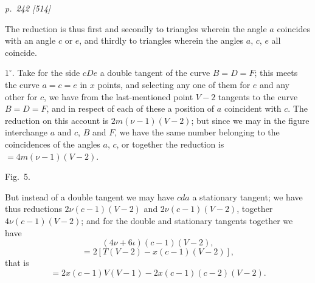 \documentclass[11pt,a4paper]{article}
\theoremstyle{plain}
\theoremstyle{definition}
\begin{document}


\bigskip
\textit{p.~242 [514]}
\smallskip

The reduction is thus first and secondly to triangles wherein the angle $a$ coincides
with an angle $c$ or $e$, and thirdly to triangles wherein the angles $a$, $c$, $e$ all coincide.

$1^{\circ}$.  Take for the side $cDe$ a double tangent of the curve $B = D = F$; this meets
the curve $a = c = e$ in $x$ points, and selecting any one of them for $e$ and any other for $c$,
we have from the last-mentioned point $V - 2$ tangents to the curve $B = D = F$, and
in respect of each of these a position of $a$ coincident with $c$.  The reduction on this
account is $2m(\nu - 1)(V - 2)$; but since we may in the figure interchange $a$ and $c$,
$B$ and $F$, we have the same number belonging to the coincidences of the angles $a$, $c$,
or together the reduction is $= 4m(\nu - 1)(V - 2)$.

\begin{center}
Fig.\ 5.\\
\end{center}

But instead of a double tangent we may have $c d a$ a stationary tangent; we have
thus reductions $2\nu(c - 1)(V - 2)$ and $2\nu(c - 1)(V - 2)$, together $4\nu(c - 1)(V - 2)$;
and for the double and stationary tangents together we have
\[
(4\nu + 6\iota)(c - 1)(V - 2),
\]
\[
= 2[T(V - 2) - x(c - 1)(V - 2)],
\]
that is
\[
= 2x(c - 1)V(V - 1) - 2x(c - 1)(c - 2)(V - 2).
\]
\end{document}
